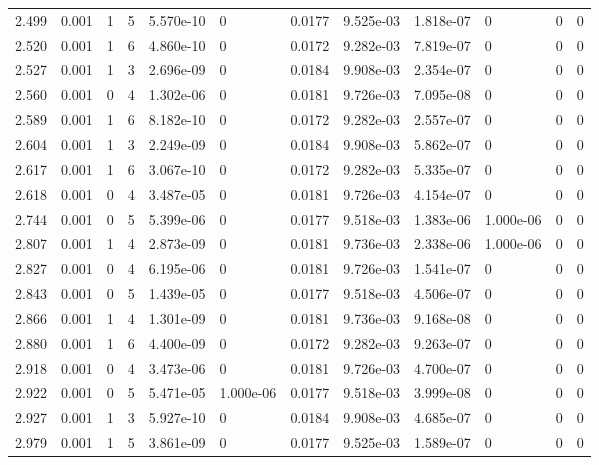 \documentclass[preview]{standalone}
\begin{document}
{{{\begin{tabular}{L{1.2cm}C{1.2cm} C{0.3cm}C{0.5cm} C{1.4cm}C{1.4cm} C{1.4cm}C{1.4cm} C{1.6cm}C{1.6cm} C{1.6cm}C{1.6cm}}
  2.499  &  0.001  & 1     &  5 &  5.570e-10  & 0  &  0.0177&   9.525e-03& 1.818e-07 & 0   &  0 & 0  \\ 
  2.520  &  0.001  & 1     &  6 &  4.860e-10  & 0  &  0.0172&   9.282e-03& 7.819e-07 & 0   &  0 & 0  \\ 
  2.527  &  0.001  & 1     &  3 &  2.696e-09  & 0  &  0.0184&   9.908e-03& 2.354e-07 & 0   &  0 & 0  \\ 
  2.560  &  0.001  & 0     &  4 &  1.302e-06  & 0  &  0.0181&   9.726e-03& 7.095e-08 & 0   &  0 & 0  \\ 
  2.589  &  0.001  & 1     &  6 &  8.182e-10  & 0  &  0.0172&   9.282e-03& 2.557e-07 & 0   &  0 & 0  \\ 
  2.604  &  0.001  & 1     &  3 &  2.249e-09  & 0  &  0.0184&   9.908e-03& 5.862e-07 & 0   &  0 & 0  \\ 
  2.617  &  0.001  & 1     &  6 &  3.067e-10  & 0  &  0.0172&   9.282e-03& 5.335e-07 & 0   &  0 & 0  \\ 
  2.618  &  0.001  & 0     &  4 &  3.487e-05  & 0  &  0.0181&   9.726e-03& 4.154e-07 & 0   &  0 & 0  \\ 
  2.744  &  0.001  & 0     &  5 &  5.399e-06  & 0  &  0.0177&   9.518e-03& 1.383e-06 & 1.000e-06   &  0 & 0  \\ 
  2.807  &  0.001  & 1     &  4 &  2.873e-09  & 0  &  0.0181&   9.736e-03& 2.338e-06 & 1.000e-06   &  0 & 0  \\ 
  2.827  &  0.001  & 0     &  4 &  6.195e-06  & 0  &  0.0181&   9.726e-03& 1.541e-07 & 0   &  0 & 0  \\ 
  2.843  &  0.001  & 0     &  5 &  1.439e-05  & 0  &  0.0177&   9.518e-03& 4.506e-07 & 0   &  0 & 0  \\ 
  2.866  &  0.001  & 1     &  4 &  1.301e-09  & 0  &  0.0181&   9.736e-03& 9.168e-08 & 0   &  0 & 0  \\ 
  2.880  &  0.001  & 1     &  6 &  4.400e-09  & 0  &  0.0172&   9.282e-03& 9.263e-07 & 0   &  0 & 0  \\ 
  2.918  &  0.001  & 0     &  4 &  3.473e-06  & 0  &  0.0181&   9.726e-03& 4.700e-07 & 0   &  0 & 0  \\ 
  2.922  &  0.001  & 0     &  5 &  5.471e-05  & 1.000e-06  &  0.0177&   9.518e-03& 3.999e-08 & 0   &  0 & 0  \\ 
  2.927  &  0.001  & 1     &  3 &  5.927e-10  & 0  &  0.0184&   9.908e-03& 4.685e-07 & 0   &  0 & 0  \\ 
  2.979  &  0.001  & 1     &  5 &  3.861e-09  & 0  &  0.0177&   9.525e-03& 1.589e-07 & 0   &  0 & 0  \\ 

\end{tabular}}}}
\end{document}
